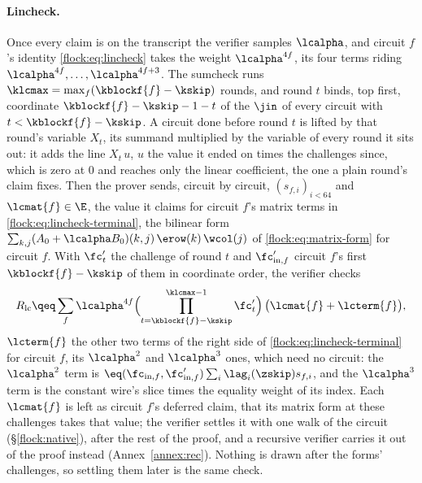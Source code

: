 \paragraph{Lincheck.} Once every claim is on the transcript the verifier samples $\lcalpha$, and circuit $f$'s identity \eqref{flock:eq:lincheck} takes the weight $\lcalpha^{4f}$, its four terms riding $\lcalpha^{4f},\dots,\lcalpha^{4f+3}$. The sumcheck runs $\klcmax=\max_f(\kblockf{f}-\kskip)$ rounds, and round $t$ binds, top first, coordinate $\kblockf{f}-\kskip-1-t$ of the $\jin$ of every circuit with $t<\kblockf{f}-\kskip$. A circuit done before round $t$ is lifted by that round's variable $X_t$, its summand multiplied by the variable of every round it sits out: it adds the line $X_t\,u$, $u$ the value it ended on times the challenges since, which is zero at $0$ and reaches only the linear coefficient, the one a plain round's claim fixes. Then the prover sends, circuit by circuit, $(s_{f,i})_{i<64}$ and $\lcmat{f}\in\E$, the value it claims for circuit $f$'s matrix terms in \eqref{flock:eq:lincheck-terminal}, the bilinear form $\sum_{k,j}(A_{0}+\lcalpha B_{0})(k,j)\,\erow(k)\,\wcol(j)$ of \eqref{flock:eq:matrix-form} for circuit $f$. With $\fc'_t$ the challenge of round $t$ and $\fc'_{\mathrm{in},f}$ circuit $f$'s first $\kblockf{f}-\kskip$ of them in coordinate order, the verifier checks
\begin{equation}\label{flock:eq:batch-lc-terminal}
R_{\mathrm{lc}}\qeq\sum_f\lcalpha^{4f}\Bigl(\prod_{t=\kblockf{f}-\kskip}^{\klcmax-1}\fc'_t\Bigr)\,\bigl(\lcmat{f}+\lcterm{f}\bigr),
\end{equation}
$\lcterm{f}$ the other two terms of the right side of \eqref{flock:eq:lincheck-terminal} for circuit $f$, its $\lcalpha^2$ and $\lcalpha^3$ ones, which need no circuit: the $\lcalpha^2$ term is $\eq(\fc_{\mathrm{in},f},\fc'_{\mathrm{in},f})\sum_i\lag_i(\zskip)s_{f,i}$, and the $\lcalpha^3$ term is the constant wire's slice times the equality weight of its index. Each $\lcmat{f}$ is left as circuit $f$'s deferred claim, that its matrix form at these challenges takes that value; the verifier settles it with one walk of the circuit (\S\ref{flock:native}), after the rest of the proof, and a recursive verifier carries it out of the proof instead (Annex~\ref{annex:rec}). Nothing is drawn after the forms' challenges, so settling them later is the same check.

